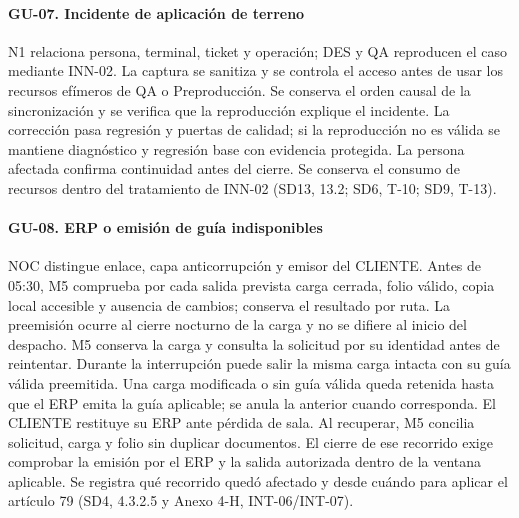 \paragraph*{GU-07. Incidente de aplicación de terreno}
N1 relaciona persona, terminal, ticket y operación; DES y QA reproducen el caso mediante INN-02. La captura se sanitiza y se controla el acceso antes de usar los recursos efímeros de QA o Preproducción. Se conserva el orden causal de la sincronización y se verifica que la reproducción explique el incidente. La corrección pasa regresión y puertas de calidad; si la reproducción no es válida se mantiene diagnóstico y regresión base con evidencia protegida. La persona afectada confirma continuidad antes del cierre. Se conserva el consumo de recursos dentro del tratamiento de INN-02 (SD13, 13.2; SD6, T-10; SD9, T-13).

\Needspace{0.19\textheight}
\paragraph*{GU-08. ERP o emisión de guía indisponibles}
NOC distingue enlace, capa anticorrupción y emisor del CLIENTE. Antes de 05:30, M5 comprueba por cada salida prevista carga cerrada, folio válido, copia local accesible y ausencia de cambios; conserva el resultado por ruta. La preemisión ocurre al cierre nocturno de la carga y no se difiere al inicio del despacho. M5 conserva la carga y consulta la solicitud por su identidad antes de reintentar. Durante la interrupción puede salir la misma carga intacta con su guía válida preemitida. Una carga modificada o sin guía válida queda retenida hasta que el ERP emita la guía aplicable; se anula la anterior cuando corresponda. El CLIENTE restituye su ERP ante pérdida de sala. Al recuperar, M5 concilia solicitud, carga y folio sin duplicar documentos. El cierre de ese recorrido exige comprobar la emisión por el ERP y la salida autorizada dentro de la ventana aplicable. Se registra qué recorrido quedó afectado y desde cuándo para aplicar el artículo 79 (SD4, 4.3.2.5 y Anexo 4-H, INT-06/INT-07).

\Needspace{0.19\textheight}
